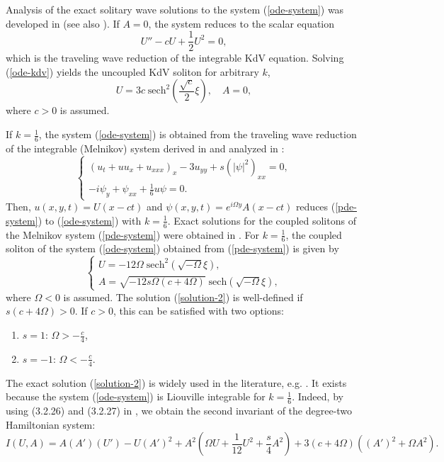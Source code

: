 \documentclass[12pt,reqno]{amsart}
\numberwithin{equation}{section}
\begin{document}
Analysis of the exact solitary wave solutions to the system (\ref{ode-system}) was developed in \cite{Anco} (see also \cite{Nguyen3}). If $A = 0$, the system reduces to the scalar equation 
\begin{equation}
\label{ode-kdv}
U'' - c U + \frac{1}{2} U^2 = 0,
\end{equation}
which is the traveling wave reduction of the integrable KdV equation.
Solving (\ref{ode-kdv}) yields the uncoupled KdV soliton for arbitrary $k$,
\begin{equation}
\label{solution-1}
U = 3 c \; \text{sech}^2\left(\frac{\sqrt{c}}{2}\xi\right), \quad A=0,
\end{equation}
where $c > 0$ is assumed. 

If $k = \frac{1}{6}$, 
the system (\ref{ode-system}) is obtained from the traveling wave reduction of the integrable 
(Melnikov) system derived in \cite{Mel1} and analyzed in \cite{Mel3,Mel2}:
\begin{equation}
\label{pde-system}
\begin{cases} 
(u_t + u u_x + u_{xxx})_x - 3 u_{yy} + s (|\psi|^2)_{xx} =0, \\ 
-i \psi_y + \psi_{xx} + \frac{1}{6} u \psi = 0.
\end{cases}
\end{equation}
Then, $u(x,y,t) = U(x-ct)$ and $\psi(x,y,t) = e^{i \Omega y} A(x-ct)$ reduces (\ref{pde-system}) to (\ref{ode-system}) with 
$k = \frac{1}{6}$. Exact solutions for the coupled solitons of the Melnikov system (\ref{pde-system}) were  obtained in \cite{Mel2}. For $k = \frac{1}{6}$, the coupled soliton of the system (\ref{ode-system}) obtained from (\ref{pde-system}) is given by 
\begin{equation}
\label{solution-2}
\begin{cases}
U=-12 \Omega \; \text{sech}^2(\sqrt{-\Omega} \xi), \\
A=\sqrt{-12 s \Omega (c+4\Omega)} \; \text{sech}(\sqrt{-\Omega} \xi),
\end{cases}
\end{equation}
where $\Omega <0$ is assumed. The solution (\ref{solution-2}) is well-defined if $s (c + 4 \Omega) > 0$. If $c > 0$, this can be satisfied with two options:
\begin{enumerate}
	\item[(a)] $s = 1$: $\Omega > -\frac{c}{4}$,
	\item[(b)] $s = -1$: $\Omega < -\frac{c}{4}$.
\end{enumerate}
The exact solution (\ref{solution-2}) is widely used in the literature, e.g. \cite{Pava,Chen}. It exists because the system (\ref{ode-system}) is Liouville integrable for $k=\frac{1}{6}$. Indeed, by using (3.2.26) and (3.2.27) in \cite{Hietarinta}, we obtain the second invariant of the degree-two Hamiltonian system:
\begin{equation}
\label{second-invariant}
I(U,A) = A (A') (U') - U (A')^2 + A^2 \left(\Omega U + \frac{1}{12} U^2 + \frac{s}{4} A^2 \right) + 3 (c + 4 \Omega) ((A')^2 + \Omega A^2).  
\end{equation}
\end{document}
